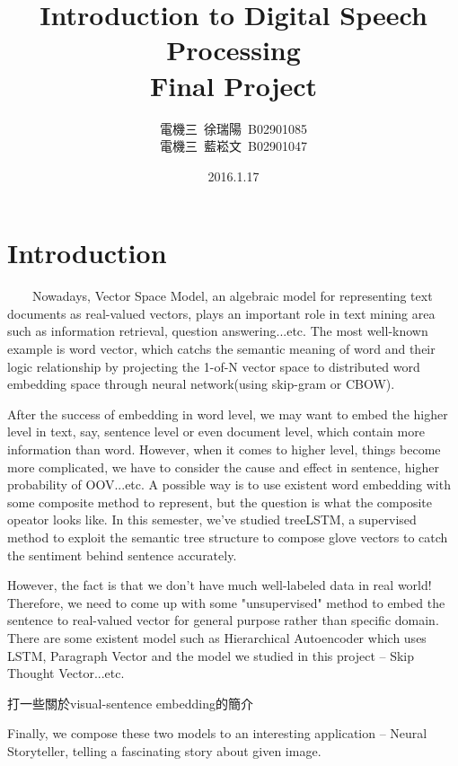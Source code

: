 \documentclass{article}
\title{Introduction to Digital Speech Processing\\
Final Project} %
\author{電機三~徐瑞陽~B02901085 \\
電機三~藍崧文~B02901047} %
\date{2016.1.17} %
\begin{document}
\maketitle
\section{Introduction}
		\par~~~~Nowadays, Vector Space Model, an algebraic model for representing text documents as real-valued vectors, plays an important role in text mining area such as information retrieval, question answering...etc. The most well-known example is word vector\cite{NIPS2013_5021}, which catchs the semantic meaning of word and their logic relationship by projecting the 1-of-N vector space to distributed word embedding space through neural network(using skip-gram or CBOW).
\newline

	\par After the success of embedding in word level, we may want to embed the higher level in text, say, sentence level or even document level, which contain more information than word. However, when it comes to higher level, things become more complicated, we have to consider the cause and effect in sentence, higher probability of OOV...etc. A possible way is to use existent word embedding with some composite method to represent, but the question is what the composite opeator looks like. In this semester, we've studied treeLSTM, a supervised method to exploit the semantic tree structure to compose glove vectors to catch the sentiment behind sentence accurately.
\newline

	\par However, the fact is that we don't have much well-labeled data in real world! Therefore, we need to come up with some "unsupervised" method to embed the sentence to real-valued vector for general purpose rather than specific domain. There are some existent model such as Hierarchical Autoencoder\cite{li2015hierarchical} which uses LSTM, Paragraph Vector\cite{DBLP:journals/corr/LeM14} and the model we studied in this project -- Skip Thought Vector\cite{kiros2015skip}...etc.
\newline

	\par 打一些關於visual-sentence embedding的簡介
\newline

	\par Finally, we compose these two models to an interesting application -- Neural Storyteller, telling a fascinating story about given image.
\end{document}
